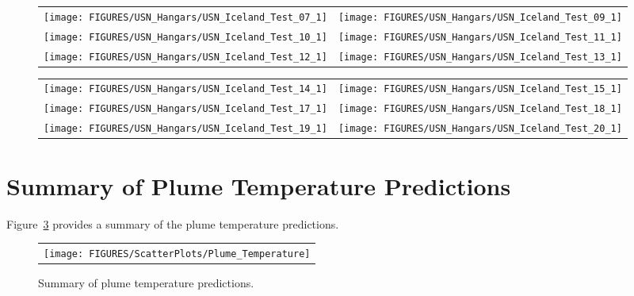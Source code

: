 \begin{figure}[p]
\begin{tabular*}{\textwidth}{l@{\extracolsep{\fill}}r}
\texttt{[image: FIGURES/USN\_Hangars/USN\_Iceland\_Test\_07\_1]} &
\texttt{[image: FIGURES/USN\_Hangars/USN\_Iceland\_Test\_09\_1]} \\
\texttt{[image: FIGURES/USN\_Hangars/USN\_Iceland\_Test\_10\_1]} &
\texttt{[image: FIGURES/USN\_Hangars/USN\_Iceland\_Test\_11\_1]} \\
\texttt{[image: FIGURES/USN\_Hangars/USN\_Iceland\_Test\_12\_1]} &
\texttt{[image: FIGURES/USN\_Hangars/USN\_Iceland\_Test\_13\_1]} \\
\end{tabular*}
\label{USN_Plume_Iceland_2}
\end{figure}

\begin{figure}[p]
\begin{tabular*}{\textwidth}{l@{\extracolsep{\fill}}r}
\texttt{[image: FIGURES/USN\_Hangars/USN\_Iceland\_Test\_14\_1]} &
\texttt{[image: FIGURES/USN\_Hangars/USN\_Iceland\_Test\_15\_1]} \\
\texttt{[image: FIGURES/USN\_Hangars/USN\_Iceland\_Test\_17\_1]} &
\texttt{[image: FIGURES/USN\_Hangars/USN\_Iceland\_Test\_18\_1]} \\
\texttt{[image: FIGURES/USN\_Hangars/USN\_Iceland\_Test\_19\_1]} &
\texttt{[image: FIGURES/USN\_Hangars/USN\_Iceland\_Test\_20\_1]} \\
\end{tabular*}
\label{USN_Plume_Iceland_3}
\end{figure}

\clearpage



\section{Summary of Plume Temperature Predictions}

Figure~\ref{Plume_Summary} provides a summary of the plume temperature predictions.

\begin{figure}[h!]
\begin{center}
\begin{tabular}{c}
\texttt{[image: FIGURES/ScatterPlots/Plume\_Temperature]}
\end{tabular}
\end{center}
\caption[Summary of plume temperature predictions]
{Summary of plume temperature predictions.}
\label{Plume_Summary}
\end{figure}



